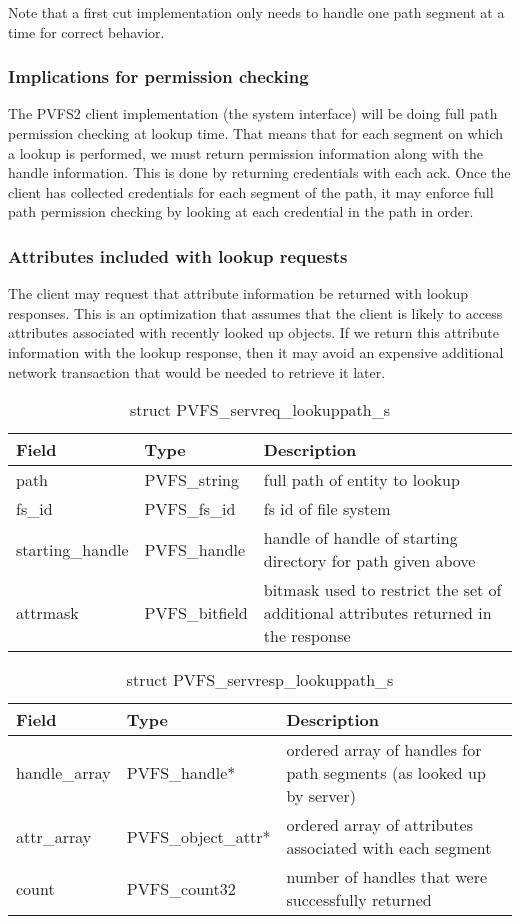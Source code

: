 \documentclass[11pt, letterpaper]{article} %
\begin{document}
Note that a first cut implementation only needs to handle one path
segment at a time for correct behavior.

\subsubsection{Implications for permission checking}

The PVFS2 client implementation (the system interface) will be doing
full path permission checking at lookup time.  That means that for each
segment on which a lookup is performed, we must return permission
information along with the handle information.  This is done by
returning credentials with each ack.  Once the client has collected
credentials for each segment of the path, it may enforce full path
permission checking by looking at each credential in the path in order. 

\subsubsection{Attributes included with lookup requests}

The client may request that attribute information be returned with
lookup responses.  This is an optimization that assumes that the client
is likely to access attributes associated with recently looked up
objects.  If we return this attribute information with the lookup
response, then it may avoid an expensive additional network
transaction that would be needed to retrieve it later.

\begin{table}[H]
\begin{tabular}{|l|l|l|}
\hline
Field & Type & Description \\
\hline
\hline
path & PVFS\_string & full path of entity to lookup\\
\hline
fs\_id & PVFS\_fs\_id & fs id of file system\\
\hline
starting\_handle & PVFS\_handle & handle of handle of starting directory
for path given above\\
\hline 
attrmask & PVFS\_bitfield & bitmask used to restrict the set of
additional attributes returned in the response\\
\hline
\end{tabular}
\caption{struct PVFS\_servreq\_lookuppath\_s
\label{tab:reqlookuppath}}
\end{table}

\begin{table}[H]
\begin{tabular}{|l|l|l|}
\hline
Field & Type & Description \\
\hline
\hline
handle\_array & PVFS\_handle* & ordered array of handles for path segments (as looked up by server)\\
\hline
attr\_array & PVFS\_object\_attr* & ordered array of attributes
associated with each segment\\
\hline 
count & PVFS\_count32 & number of handles that were successfully
returned\\
\hline
\end{tabular}
\caption{struct PVFS\_servresp\_lookuppath\_s \label{tab:resplookuppath}}
\end{table}
\end{document}
